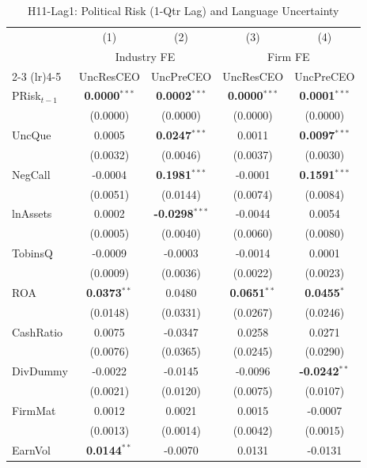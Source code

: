 \begin{landscape}
\begin{table}[H]
\setlength{\tabcolsep}{3pt}
\renewcommand{\arraystretch}{0.85}
\centering
\caption{H11-Lag1: Political Risk (1-Qtr Lag) and Language Uncertainty}
\label{tab:h11_lag1}
\scriptsize
\begin{tabular}{lcccc}
\toprule
 & (1) & (2) & (3) & (4) \\
 & \multicolumn{2}{c}{Industry FE} & \multicolumn{2}{c}{Firm FE} \\
\cmidrule(lr){2-3} \cmidrule(lr){4-5}
 & UncResCEO & UncPreCEO & UncResCEO & UncPreCEO \\
\midrule
PRisk$_{t-1}$ & \textbf{0.0000}$^{***}$ & \textbf{0.0002}$^{***}$ & \textbf{0.0000}$^{***}$ & \textbf{0.0001}$^{***}$ \\
 & (0.0000) & (0.0000) & (0.0000) & (0.0000) \\
\midrule
UncQue & 0.0005 & \textbf{0.0247}$^{***}$ & 0.0011 & \textbf{0.0097}$^{***}$ \\
 & (0.0032) & (0.0046) & (0.0037) & (0.0030) \\
NegCall & -0.0004 & \textbf{0.1981}$^{***}$ & -0.0001 & \textbf{0.1591}$^{***}$ \\
 & (0.0051) & (0.0144) & (0.0074) & (0.0084) \\
lnAssets & 0.0002 & \textbf{-0.0298}$^{***}$ & -0.0044 & 0.0054 \\
 & (0.0005) & (0.0040) & (0.0060) & (0.0080) \\
TobinsQ & -0.0009 & -0.0003 & -0.0014 & 0.0001 \\
 & (0.0009) & (0.0036) & (0.0022) & (0.0023) \\
ROA & \textbf{0.0373}$^{**}$ & 0.0480 & \textbf{0.0651}$^{**}$ & \textbf{0.0455}$^{*}$ \\
 & (0.0148) & (0.0331) & (0.0267) & (0.0246) \\
CashRatio & 0.0075 & -0.0347 & 0.0258 & 0.0271 \\
 & (0.0076) & (0.0365) & (0.0245) & (0.0290) \\
DivDummy & -0.0022 & -0.0145 & -0.0096 & \textbf{-0.0242}$^{**}$ \\
 & (0.0021) & (0.0120) & (0.0075) & (0.0107) \\
FirmMat & 0.0012 & 0.0021 & 0.0015 & -0.0007 \\
 & (0.0013) & (0.0014) & (0.0042) & (0.0015) \\
EarnVol & \textbf{0.0144}$^{**}$ & -0.0070 & 0.0131 & -0.0131 \\

\end{tabular}
\end{table}
\end{landscape}
